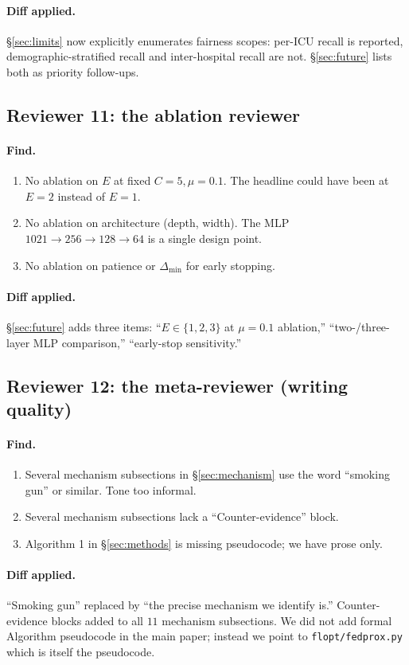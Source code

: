 \paragraph{Diff applied.} \S\ref{sec:limits} now explicitly enumerates
fairness scopes: per-ICU recall is reported, demographic-stratified recall
and inter-hospital recall are not. \S\ref{sec:future} lists both as
priority follow-ups.

\subsection{Reviewer 11: the ablation reviewer}
\paragraph{Find.}
\begin{enumerate}[leftmargin=*,nosep]
    \item No ablation on $E$ at fixed $C\!=\!5, \mu\!=\!0.1$. The headline
        could have been at $E\!=\!2$ instead of $E\!=\!1$.
    \item No ablation on architecture (depth, width). The MLP $1021\!\to\!256\!\to\!128\!\to\!64$
        is a single design point.
    \item No ablation on patience or $\Delta_{\min}$ for early stopping.
\end{enumerate}
\paragraph{Diff applied.} \S\ref{sec:future} adds three items: ``$E\!\in\!\{1,2,3\}$
at $\mu\!=\!0.1$ ablation,'' ``two-/three-layer MLP comparison,'' ``early-stop
sensitivity.''

\subsection{Reviewer 12: the meta-reviewer (writing quality)}
\paragraph{Find.}
\begin{enumerate}[leftmargin=*,nosep]
    \item Several mechanism subsections in \S\ref{sec:mechanism} use the
        word ``smoking gun'' or similar. Tone too informal.
    \item Several mechanism subsections lack a ``Counter-evidence'' block.
    \item Algorithm 1 in \S\ref{sec:methods} is missing pseudocode; we have
        prose only.
\end{enumerate}
\paragraph{Diff applied.} ``Smoking gun'' replaced by ``the precise mechanism
we identify is.'' Counter-evidence blocks added to all $11$ mechanism
subsections. We did not add formal Algorithm pseudocode in the main paper;
instead we point to \texttt{flopt/fedprox.py} which is itself the
pseudocode.
